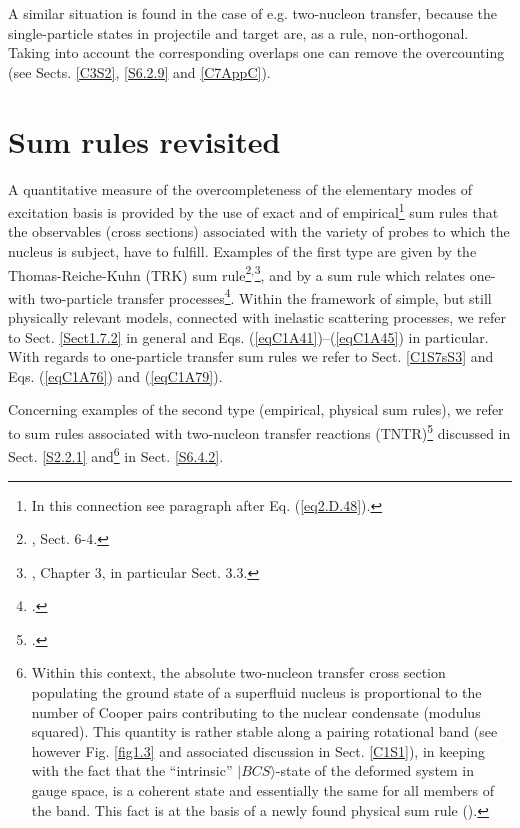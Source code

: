 A similar situation is found in the case of e.g. two-nucleon transfer, because the single-particle states in projectile and target are, as a rule, non-orthogonal. Taking into account the corresponding  overlaps one can remove the overcounting (see Sects. \ref{C3S2}, \ref{S6.2.9} and  \ref{C7AppC}).


\section{Sum rules revisited}\label{C1S2}
A quantitative measure of the overcompleteness of  the elementary modes of excitation basis is provided by the use of exact and of empirical\footnote{In this connection see paragraph after Eq. (\ref{eq2.D.48}).}  sum rules that the observables (cross sections) associated with the variety of probes to which the nucleus is subject, have to fulfill. Examples of the first type are given by the Thomas-Reiche-Kuhn (TRK) sum rule\footnote{\cite{Bohr:75}, Sect. 6-4.}$^,$\footnote{\cite{Bertsch:05}, Chapter 3, in particular Sect. 3.3.}, and by a sum rule which relates one- with two-particle transfer processes\footnote{\cite{Bayman:72,Lanford:77}.}. Within the framework of simple, but still physically relevant models, connected with inelastic scattering processes, we refer to Sect. \ref{Sect1.7.2} in general and Eqs.  (\ref{eqC1A41})--(\ref{eqC1A45}) in particular. With regards to one-particle transfer sum rules we refer to Sect. \ref{C1S7sS3} and Eqs. (\ref{eqC1A76}) and (\ref{eqC1A79}).


 Concerning examples of the second type (empirical, physical sum rules), we refer to sum rules associated with two-nucleon transfer reactions (TNTR)\footnote{\cite{Broglia:72b}.} discussed in Sect. \ref{S2.2.1} and\footnote{Within this context, the absolute two-nucleon transfer cross section populating the ground state of a superfluid nucleus is proportional to the number of Cooper pairs 
 	 contributing to the nuclear condensate (modulus squared). This quantity is rather stable along a pairing rotational band (see however Fig. \ref{fig1.3} and associated discussion in Sect. \ref{C1S1}), in keeping with the fact that the ``intrinsic'' $|BCS\rangle$-state of the deformed system in gauge space, is a coherent state and essentially the same for all members of the band. This fact is at the basis of a newly found physical sum rule \mbox{(\cite{Potel:17})}.  } in Sect. \ref{S6.4.2}.












